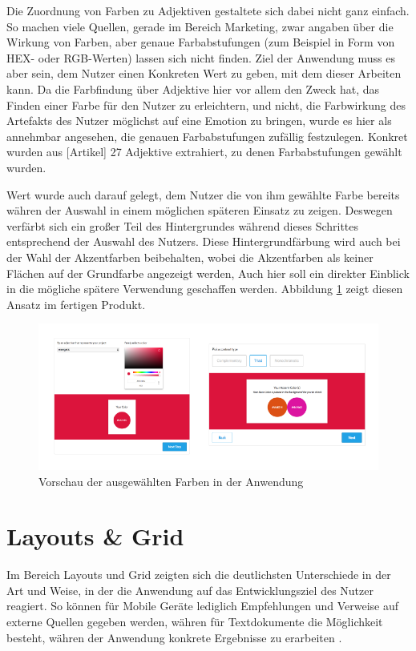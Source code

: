 Die Zuordnung von Farben zu Adjektiven gestaltete sich dabei nicht ganz einfach. So machen viele Quellen, gerade im Bereich Marketing, zwar angaben über die Wirkung von Farben, aber genaue Farbabstufungen (zum Beispiel in Form von HEX- oder RGB-Werten) lassen sich nicht finden.
Ziel der Anwendung muss es aber sein, dem Nutzer einen Konkreten Wert zu geben, mit dem dieser Arbeiten kann. Da die Farbfindung über Adjektive hier vor allem den Zweck hat, das Finden einer Farbe für den Nutzer zu erleichtern, und nicht, die Farbwirkung des Artefakts des Nutzer möglichst auf eine Emotion zu bringen, wurde es hier als annehmbar angesehen, die genauen Farbabstufungen zufällig festzulegen. Konkret wurden aus [Artikel] 27 Adjektive extrahiert, zu denen Farbabstufungen gewählt wurden.

Wert wurde auch darauf gelegt, dem Nutzer die von ihm gewählte Farbe bereits währen der Auswahl in einem möglichen späteren Einsatz zu zeigen. Deswegen verfärbt sich ein großer Teil des Hintergrundes während dieses Schrittes entsprechend der Auswahl des Nutzers. Diese Hintergrundfärbung wird auch bei der Wahl der Akzentfarben beibehalten, wobei die Akzentfarben als keiner Flächen auf der Grundfarbe angezeigt werden, Auch hier soll ein direkter Einblick in die mögliche spätere Verwendung geschaffen werden. Abbildung \ref{fig:colors_bg} zeigt diesen Ansatz im fertigen Produkt.

\begin{figure}[h]
    \centering
    \includegraphics[width=1\textwidth]{images/colors_background.png}
    \caption{Vorschau der ausgewählten Farben in der Anwendung}
    \label{fig:colors_bg}
\end{figure}

\section{Layouts \& Grid}

Im Bereich Layouts und Grid zeigten sich die deutlichsten Unterschiede in der Art und Weise, in der die Anwendung auf das Entwicklungsziel des Nutzer reagiert.
So können für Mobile Geräte lediglich Empfehlungen und Verweise auf externe Quellen gegeben werden, währen für Textdokumente die Möglichkeit besteht, währen der Anwendung konkrete Ergebnisse zu erarbeiten \cite{PoplawskiPP}.

